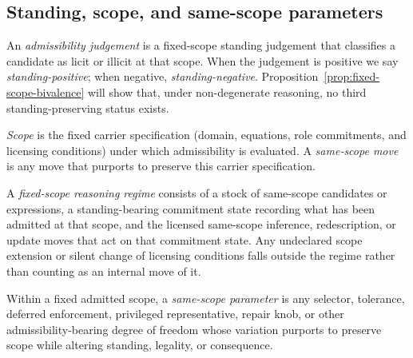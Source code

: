 \subsection{Standing, scope, and same-scope parameters}

\begin{definition}\label{def:standing}
An \emph{admissibility judgement} is a fixed-scope standing judgement that classifies a candidate as licit or illicit at that scope. When the judgement is positive we say \emph{standing-positive}; when negative, \emph{standing-negative}. Proposition~\ref{prop:fixed-scope-bivalence} will show that, under non-degenerate reasoning, no third standing-preserving status exists.
\end{definition}

\begin{definition}\label{def:scope}
\emph{Scope} is the fixed carrier specification (domain, equations, role commitments,
and licensing conditions) under which admissibility is evaluated.
A \emph{same-scope move} is any move that purports to preserve this carrier specification.
\end{definition}

\begin{definition}\label{def:fixed-scope-reasoning-regime}
A \emph{fixed-scope reasoning regime} consists of a stock of same-scope candidates or expressions, a standing-bearing commitment state recording what has been admitted at that scope, and the licensed same-scope inference, redescription, or update moves that act on that commitment state. Any undeclared scope extension or silent change of licensing conditions falls outside the regime rather than counting as an internal move of it.
\end{definition}

\begin{definition}\label{def:same-scope-parameter}
Within a fixed admitted scope, a \emph{same-scope parameter} is any selector, tolerance,
deferred enforcement, privileged representative, repair knob, or other admissibility-bearing
degree of freedom whose variation purports to preserve scope while altering standing,
legality, or consequence.
\end{definition}





